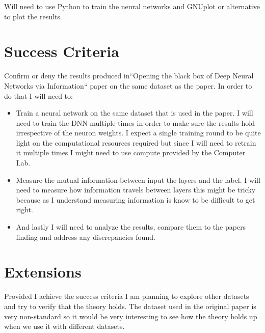 \documentclass[12pt]{article}
\begin{document}
Will need to use Python to train the neural networks and GNUplot or alternative
to plot the results.



\section*{Success Criteria}

Confirm or deny the results produced in``Opening the black box of Deep Neural
Networks via Information`` paper on the same dataset as the paper. In order to do
that I will need to:

\begin{itemize}
  \item Train a neural network on the same dataset that is used in the paper. I
    will need to train the DNN multiple times in order to make sure the results
    hold irrespective of the neuron weights. I expect a single training round to
    be quite light on the computational resources required but since I will need
    to retrain it multiple times I might need to use compute provided by the
    Computer Lab.
  \item Measure the mutual information between input the layers and the label. I
    will need to measure how information travels between layers this might be
    tricky because as I understand measuring information is know to be difficult
    to get right.
  \item And lastly I will need to analyze the results, compare them to the
    papers finding and address any discrepancies found.
\end{itemize}

\section*{Extensions}

Provided I achieve the success criteria I am planning to explore other datasets
and try to verify that the theory holds.
The dataset used in the original paper is very non-standard so it would be very
interesting to see how the theory holds up when we use it with different
datasets.
\end{document}
